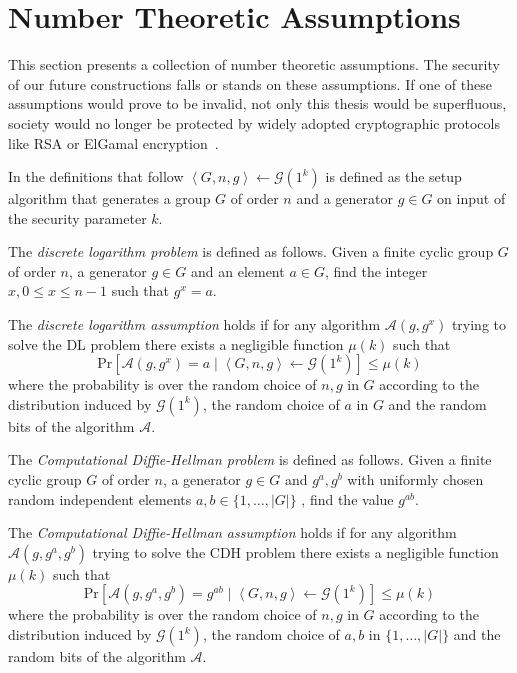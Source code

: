 \section{Number Theoretic Assumptions}
\label{sec:number_theoretic_assumptions}
This section presents a collection of number theoretic assumptions. The security of our future constructions falls or stands on these assumptions. If one of these assumptions would prove to be invalid, not only this thesis would be superfluous, society would no longer be protected by widely adopted cryptographic protocols like RSA or ElGamal encryption~\cite{art:Boneh98,book:handbook_of_applied_cryptography}.

In the definitions that follow $\left< G, n, g \right> \leftarrow \mathcal{G} \left( 1^k \right)$ is defined as the setup algorithm that generates a group $G$ of order $n$ and a generator $g \in G$ on input of the security parameter $k$.

\begin{defn}[DL]
\label{def:dl}
The \textit{discrete logarithm problem} is defined as follows. Given a finite cyclic group $G$ of order $n$, a generator $g \in G$ and an element $a \in G$, find the integer $x, 0 \leq x \leq n-1$ such that $g^x = a$.

The \textit{discrete logarithm assumption} holds if for any algorithm $\mathcal{A} \left( g, g^x \right)$ trying to solve the DL problem there exists a negligible function $\mu \left( k \right)$ such that 
 \begin{equation*}
  \textrm{Pr} \left[ \mathcal{A} \left( g, g^x \right) = a \mid \left< G, n, g \right> \leftarrow \mathcal{G} \left( 1^{k} \right)\right] \leq \mu \left( k \right)
 \end{equation*}
 where the probability is over the random choice of $n, g$ in $G$ according to the distribution induced by $\mathcal{G} \left( 1^k \right)$, the random choice of $a$ in $G$ and the random bits of the algorithm $\mathcal{A}$.
\end{defn}


\begin{defn}[CDH]
\label{def:cdh}
The \textit{Computational Diffie-Hellman problem} is defined as follows. Given a finite cyclic group $G$ of order $n$, a generator $g \in G$ and $g^a, g^b$ with uniformly chosen random independent elements $a, b \in \{ 1, \ldots, | G |\}$ , find the value $g^{ab}$.


The \textit{Computational Diffie-Hellman assumption} holds if for any algorithm $\mathcal{A} \left( g, g^a, g^b \right)$ trying to solve the CDH problem there exists a negligible function $\mu \left( k \right)$ such that 
 \begin{equation*}
  \textrm{Pr} \left[ \mathcal{A} \left( g, g^a, g^b \right) = g^{ab} \mid \left< G, n, g \right> \leftarrow \mathcal{G} \left( 1^{k} \right)\right] \leq \mu \left( k \right)
 \end{equation*}
 where the probability is over the random choice of $n, g$ in $G$ according to the distribution induced by $\mathcal{G} \left( 1^k \right)$, the random choice of $a, b$ in $\{ 1, \ldots, | G |\}$ and the random bits of the algorithm $\mathcal{A}$.
\end{defn}

